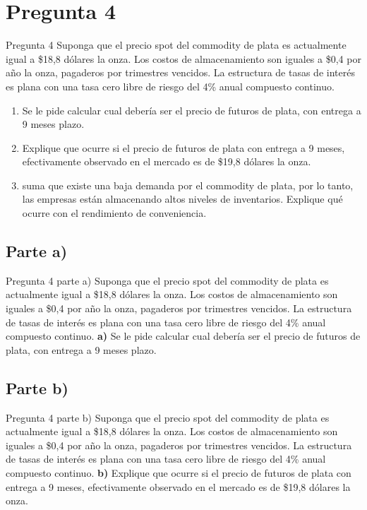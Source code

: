 \documentclass{beamer}
\begin{document}
\section{Pregunta 4}
\begin{frame}{Pregunta 4}
  Suponga que el precio spot del commodity de plata es actualmente igual a \$18,8 dólares  
la onza. Los costos de almacenamiento son iguales a \$0,4 por año la onza, pagaderos por
 trimestres vencidos. La estructura de tasas de interés es plana con una tasa cero libre 
 de riesgo del 4\% anual compuesto continuo.
  \begin{enumerate}[label=\textbf{\alph*)}]
      \item   Se le pide calcular cual debería ser el precio de futuros de plata, con entrega a 9 meses plazo.
      \item 	Explique que ocurre si el precio de futuros de plata con entrega a 9 meses,
      efectivamente observado en el mercado es de \$19,8 dólares la onza.
      \item suma que existe una baja demanda por el commodity de plata, por lo tanto,
      las empresas están almacenando altos niveles de inventarios. 
      Explique qué ocurre con el rendimiento de conveniencia.

  \end{enumerate}
\end{frame}

\subsection{Parte a)}
\begin{frame}{Pregunta 4 parte a)}
  Suponga que el precio spot del commodity de plata es actualmente igual a \$18,8 dólares  
  la onza. Los costos de almacenamiento son iguales a \$0,4 por año la onza, pagaderos por
   trimestres vencidos. La estructura de tasas de interés es plana con una tasa cero libre 
   de riesgo del 4\% anual compuesto continuo.
  \textbf{a)} Se le pide calcular cual debería ser el precio de futuros de plata, con entrega a 9 meses plazo.
  
\end{frame}

\subsection{Parte b)}
\begin{frame}{Pregunta 4 parte b)}
  Suponga que el precio spot del commodity de plata es actualmente igual a \$18,8 dólares  
  la onza. Los costos de almacenamiento son iguales a \$0,4 por año la onza, pagaderos por
   trimestres vencidos. La estructura de tasas de interés es plana con una tasa cero libre 
   de riesgo del 4\% anual compuesto continuo.
  \textbf{b)} Explique que ocurre si el precio de futuros de plata con entrega a 9 meses,
  efectivamente observado en el mercado es de \$19,8 dólares la onza.
  
\end{frame}
\end{document}
